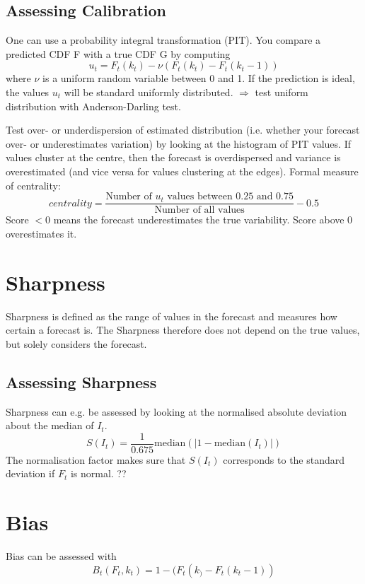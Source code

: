 \subsection{Assessing Calibration} 
One can use a probability integral transformation (PIT). You compare a predicted CDF F with a true CDF G by computing
\begin{equation}
u_t = F_t(k_t) - \nu (F_t(k_t) - F_t(k_t - 1) ) 
\end{equation}
where $\nu$ is a uniform random variable between 0 and 1. If the prediction is ideal, the values $u_t$ will be standard uniformly distributed. $\Rightarrow$ test uniform distribution with Anderson-Darling test. 

Test over- or underdispersion of estimated distribution (i.e. whether your forecast over- or underestimates variation) by looking at the histogram of PIT values. If values cluster at the centre, then the forecast is overdispersed and variance is overestimated (and vice versa for values clustering at the edges).  
Formal measure of centrality: 
$$centrality = \frac{\text{Number of $u_t$ values between 0.25 and 0.75}}{\text{Number of all values}} - 0.5$$
Score $< 0$ means the forecast underestimates the true variability. Score above 0 overestimates it. 

\section{Sharpness} 
Sharpness is defined as the range of values in the forecast and measures how certain a forecast is. The Sharpness therefore does not depend on the true values, but solely considers the forecast. 

\subsection{Assessing Sharpness}
Sharpness can e.g. be assessed by looking at the normalised absolute deviation about the median of $I_t$. 
\begin{equation}
S(I_t) = \frac{1}{0.675} \text{median} (| 1 - \text{median}(I_t)|)
\end{equation} 
The normalisation factor makes sure that $S(I_t)$ corresponds to the standard deviation if $F_t$  is normal. ??

\section{Bias}
Bias can be assessed with
\begin{equation}
B_t(F_t,k_t) = 1 - (F_t(k_) - F_t(k_t - 1))
\end{equation}

